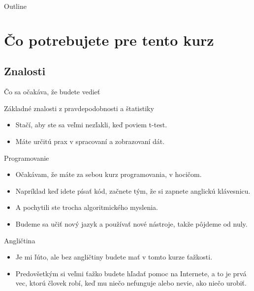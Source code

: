 \documentclass[9pt]{beamer}
\begin{document}
\begin{frame}{Outline}
\tableofcontents
\end{frame}

\section{Čo potrebujete pre tento kurz}

\subsection{Znalosti}
\begin{frame}{Čo sa očakáva, že budete vedieť}
	\begin{block}{Základné znalosti z pravdepodobnosti a štatistiky}
		\begin{itemize}
			\item Stačí, aby ste sa veľmi nezľakli, keď poviem t-test.
			\item Máte určitú prax v spracovaní a zobrazovaní dát.
		\end{itemize}
	\end{block}
	\begin{block}{Programovanie}
		\begin{itemize}
			\item Očakávam, že máte za sebou kurz programovania, v hocičom.
			\item Napríklad keď idete písať kód, začnete tým, že si zapnete anglickú klávesnicu.
			\item A pochytili ste trocha algoritmického myslenia. 
			\item Budeme sa učiť nový jazyk a používať nové nástroje, takže pôjdeme od nuly.
		\end{itemize}
	\end{block}
	\begin{block}{Angličtina}
		\begin{itemize}
			\item Je mi ľúto, ale bez angličtiny budete mať v tomto kurze ťažkosti.
			\item Predovšetkým si veľmi ťažko budete hľadať pomoc na Internete, a to je prvá vec, ktorú človek robí, keď mu niečo nefunguje alebo nevie, ako niečo urobiť. 
		\end{itemize}
	\end{block}
\end{frame}
\end{document}
